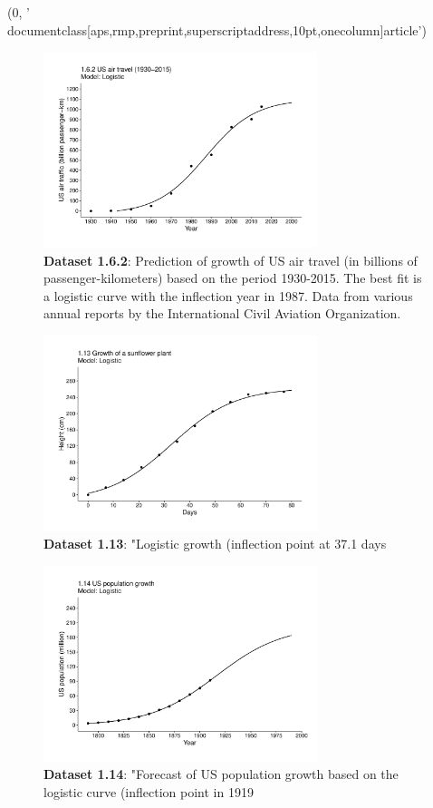 (0, '\\documentclass[aps,rmp,preprint,superscriptaddress,10pt,onecolumn]{article}\n')
\begin{document}
\begin{figure}[h]
\includegraphics[width=8cm]{output/figs-ggplot/1.6.2.pdf}
\caption{\textbf{Dataset 1.6.2}: Prediction of growth of US air travel (in billions of passenger-kilometers) based on the period 1930-2015. The best fit is a logistic curve with the inflection year in 1987. Data from various annual reports by the International Civil Aviation Organization. }
\end{figure}
	
\begin{figure}[h]
\includegraphics[width=8cm]{output/figs-ggplot/1.13.pdf}
\caption{\textbf{Dataset 1.13}: "Logistic growth (inflection point at 37.1 days}
\end{figure}
	
\begin{figure}[h]
\includegraphics[width=8cm]{output/figs-ggplot/1.14.pdf}
\caption{\textbf{Dataset 1.14}: "Forecast of US population growth based on the logistic curve (inflection point in 1919}
\end{figure}
	
\end{document}
